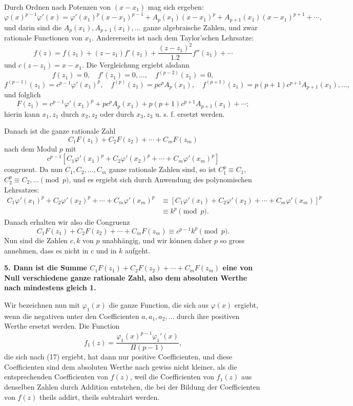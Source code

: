 \documentclass[11pt]{article}
\begin{document}
Durch Ordnen nach Potenzen von $(x-x_1)$ mag sich ergeben:
\[
\varphi(x)^{p-1}\varphi'(x)=
\varphi'(x_1)^p(x-x_1)^{p-1}
+A_p(x_1)(x-x_1)^p
+A_{p+1}(x_1)(x-x_1)^{p+1}+\cdots,
\]
und darin sind die $A_p(x_1),A_{p+1}(x_1),\ldots$ ganze algebraische Zahlen, und zwar rationale Functionen von $x_1$. Andererseits ist nach dem Taylor'schen Lehrsatze:
\[
f(z)=f(z_1)+(z-z_1)f'(z_1)+\frac{(z-z_1)^2}{1.2}f''(z_1)+\cdots
\]
und $c(z-z_1)=x-x_1$. Die Vergleichung ergiebt alsdann
\[
f(z_1)=0,\quad f'(z_1)=0,\ldots,\quad f^{(p-2)}(z_1)=0,
\]
\[
f^{(p-1)}(z_1)=c^{p-1}\varphi'(x_1)^p,\quad
f^{(p)}(z_1)=pc^pA_p(x_1),\quad
f^{(p+1)}(z_1)=p(p+1)c^{p+1}A_{p+1}(x_1),\ldots,
\]
und folglich
\[
F(z_1)=c^{p-1}\varphi'(x_1)^p+pc^pA_p(x_1)+p(p+1)c^{p+1}A_{p+1}(x_1)+\cdots;
\]
hierin kann $x_1,z_1$ durch $x_2,z_2$ oder durch $x_3,z_3$ u. s. f. ersetzt werden.

Danach ist die ganze rationale Zahl
\[
C_1F(z_1)+C_2F(z_2)+\cdots+C_mF(z_m)
\]
nach dem Modul $p$ mit
\[
c^{p-1}\left[C_1\varphi'(x_1)^p+C_2\varphi'(x_2)^p+\cdots+C_m\varphi'(x_m)^p\right]
\]
congruent. Da nun $C_1,C_2,\ldots,C_m$ ganze rationale Zahlen sind, so ist $C_1^p\equiv C_1$, $C_2^p\equiv C_2,\ldots\pmod p$, und es ergiebt sich durch Anwendung des polynomischen Lehrsatzes:
\[
\begin{aligned}
C_1\varphi'(x_1)^p+C_2\varphi'(x_2)^p+\cdots+C_m\varphi'(x_m)^p
&\equiv
\left[C_1\varphi'(x_1)+C_2\varphi'(x_2)+\cdots+C_m\varphi'(x_m)\right]^p\\
&\equiv k^p \pmod p.
\end{aligned}
\]
Danach erhalten wir also die Congruenz
\begin{equation}\tag{18}
C_1F(z_1)+C_2F(z_2)+\cdots+C_mF(z_m)\equiv c^{p-1}k^p\pmod p.
\end{equation}
Nun sind die Zahlen $c,k$ von $p$ unabhängig, und wir können daher $p$ so gross annehmen, dass es nicht in $c$ und in $k$ aufgeht.

\textbf{5. Dann ist die Summe $C_1F(z_1)+C_2F(z_2)+\cdots+C_mF(z_m)$ eine von Null verschiedene ganze rationale Zahl, also dem absoluten Werthe nach mindestens gleich 1.}

Wir bezeichnen nun mit $\varphi_1(x)$ die ganze Function, die sich aus $\varphi(x)$ ergiebt, wenn die negativen unter den Coefficienten $a,a_1,a_2,\ldots$ durch ihre positiven Werthe ersetzt werden. Die Function
\[
f_1(z)=\frac{\varphi_1(x)^{p-1}\varphi_1'(x)}{\Pi(p-1)},
\]
die sich nach (17) ergiebt, hat dann nur positive Coefficienten, und diese Coefficienten sind dem absoluten Werthe nach gewiss nicht kleiner, als die entsprechenden Coefficienten von $f(z)$, weil die Coefficienten von $f_1(z)$ aus denselben Zahlen durch Addition entstehen, die bei der Bildung der Coefficienten von $f(z)$ theils addirt, theils subtrahirt werden.
\end{document}
